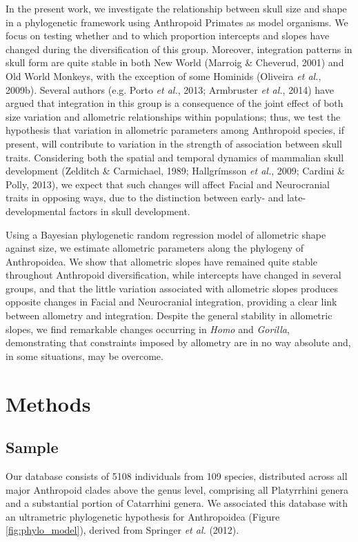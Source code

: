 \documentclass[12pt,twoside]{report}
\begin{document}
In the present work, we investigate the relationship between skull size
and shape in a phylogenetic framework using Anthropoid Primates as model
organisms. We focus on testing whether and to which proportion
intercepts and slopes have changed during the diversification of this
group. Moreover, integration patterns in skull form are quite stable in
both New World (Marroig \& Cheverud, 2001) and Old World Monkeys, with
the exception of some Hominids (Oliveira \emph{et al.}, 2009b). Several
authors (e.g. Porto \emph{et al.}, 2013; Armbruster \emph{et al.}, 2014)
have argued that integration in this group is a consequence of the joint
effect of both size variation and allometric relationships within
populations; thus, we test the hypothesis that variation in allometric
parameters among Anthropoid species, if present, will contribute to
variation in the strength of association between skull traits.
Considering both the spatial and temporal dynamics of mammalian skull
development (Zelditch \& Carmichael, 1989; Hallgrímsson \emph{et al.},
2009; Cardini \& Polly, 2013), we expect that such changes will affect
Facial and Neurocranial traits in opposing ways, due to the distinction
between early- and late-developmental factors in skull development.

Using a Bayesian phylogenetic random regression model of allometric
shape against size, we estimate allometric parameters along the
phylogeny of Anthropoidea. We show that allometric slopes have remained
quite stable throughout Anthropoid diversification, while intercepts
have changed in several groups, and that the little variation associated
with allometric slopes produces opposite changes in Facial and
Neurocranial integration, providing a clear link between allometry and
integration. Despite the general stability in allometric slopes, we find
remarkable changes occurring in \emph{Homo} and \emph{Gorilla},
demonstrating that constraints imposed by allometry are in no way
absolute and, in some situations, may be overcome.

\section{Methods}\label{methods-1}

\subsection{Sample}\label{sample-1}

Our database consists of 5108 individuals from 109 species, distributed
across all major Anthropoid clades above the genus level, comprising all
Platyrrhini genera and a substantial portion of Catarrhini genera. We
associated this database with an ultrametric phylogenetic hypothesis for
Anthropoidea (Figure \ref{fig:phylo_model}), derived from Springer
\emph{et al.} (2012).
\end{document}
